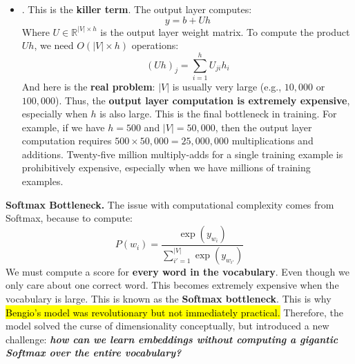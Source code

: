 \begin{itemize}
    \item {}. This is the \textbf{killer term}. The output layer computes:
    \begin{equation*}
        y = b + U h
    \end{equation*}
    Where $U \in \mathbb{R}^{\left|V\right| \times h}$ is the output layer weight matrix. To compute the product $Uh$, we need $O\left(\left|V\right| \times h\right)$ operations:
    \begin{equation*}
        \left(Uh\right)_{j} = \sum_{i=1}^{h} U_{ji} h_i
    \end{equation*}
    And here is the \textbf{real problem}: $\left|V\right|$ is usually very large (e.g., $10,000$ or $100,000$). Thus, the \textbf{output layer computation is extremely expensive}, especially when $h$ is also large. This is the final bottleneck in training. For example, if we have $h = 500$ and $\left|V\right| = 50,000$, then the output layer computation requires $500 \times 50,000 = 25,000,000$ multiplications and additions. Twenty-five million multiply-adds for a single training example is prohibitively expensive, especially when we have millions of training examples.
\end{itemize}
\textcolor{Red2}{ \textbf{Softmax Bottleneck.}} The issue with computational complexity comes from Softmax, because to compute:
\begin{equation*}
    P\left(w_i\right) = \frac{\exp\left(y_{w_i}\right)}{\displaystyle\sum_{i'=1}^{\left|V\right|} \exp\left(y_{w_{i'}}\right)}
\end{equation*}
We must compute a score for \textbf{every word in the vocabulary}. Even though we only care about one correct word. This becomes extremely expensive when the vocabulary is large. This is known as the \textbf{Softmax bottleneck}. This is why \hl{Bengio's model was revolutionary but not immediately practical.} Therefore, the model solved the curse of dimensionality conceptually, but introduced a new challenge: \emph{\textbf{how can we learn embeddings without computing a gigantic Softmax over the entire vocabulary?}}